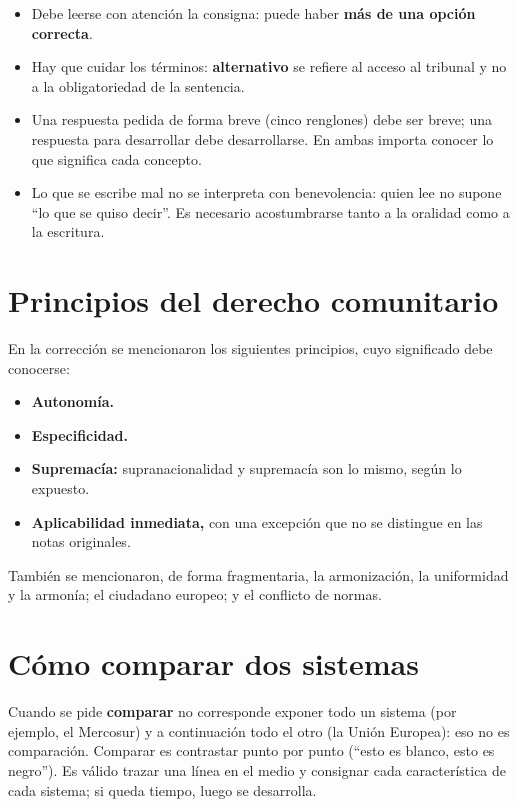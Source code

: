 \documentclass[12pt,oneside]{book}
\begin{document}
\begin{itemize}
    \item Debe leerse con atención la consigna: puede haber \textbf{más de una opción correcta}.
    \item Hay que cuidar los términos: \textbf{alternativo} se refiere al acceso al tribunal y no a la obligatoriedad de la sentencia.
    \item Una respuesta pedida de forma breve (cinco renglones) debe ser breve; una respuesta para desarrollar debe desarrollarse. En ambas importa conocer lo que significa cada concepto.
    \item Lo que se escribe mal no se interpreta con benevolencia: quien lee no supone ``lo que se quiso decir''. Es necesario acostumbrarse tanto a la oralidad como a la escritura.
\end{itemize}

\section{Principios del derecho comunitario}

En la corrección se mencionaron los siguientes principios, cuyo significado debe conocerse:

\begin{itemize}
    \item \textbf{Autonomía.}
    \item \textbf{Especificidad.}
    \item \textbf{Supremacía:} supranacionalidad y supremacía son lo mismo, según lo expuesto.
    \item \textbf{Aplicabilidad inmediata,} con una excepción que no se distingue en las notas originales.
\end{itemize}

También se mencionaron, de forma fragmentaria, la armonización, la uniformidad y la armonía; el ciudadano europeo; y el conflicto de normas.

\section{Cómo comparar dos sistemas}

Cuando se pide \textbf{comparar} no corresponde exponer todo un sistema (por ejemplo, el Mercosur) y a continuación todo el otro (la Unión Europea): eso no es comparación. Comparar es contrastar punto por punto (``esto es blanco, esto es negro''). Es válido trazar una línea en el medio y consignar cada característica de cada sistema; si queda tiempo, luego se desarrolla.
\end{document}
